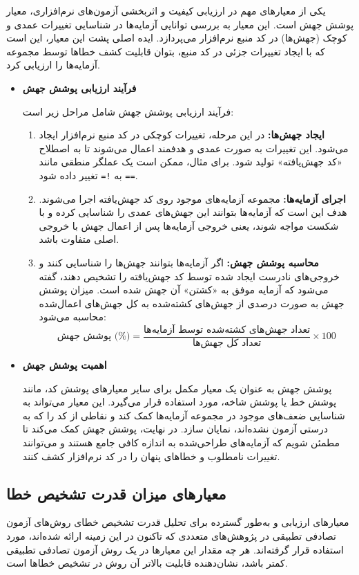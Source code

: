یکی از معیارهای مهم در ارزیابی کیفیت و اثربخشی آزمون‌های نرم‌افزاری، معیار پوشش جهش است. این معیار به بررسی توانایی آزمایه‌ها در شناسایی تغییرات عمدی و کوچک (جهش‌ها) در کد منبع نرم‌افزار می‌پردازد. ایده اصلی پشت این معیار، این است که با ایجاد تغییرات جزئی در کد منبع، بتوان قابلیت کشف خطاها توسط مجموعه آزمایه‌ها را ارزیابی کرد.

\begin{itemize}
	\item \textbf{فرآیند ارزیابی پوشش جهش}

فرآیند ارزیابی پوشش جهش شامل مراحل زیر است:

\begin{enumerate}
	\item \textbf{ایجاد جهش‌ها:} در این مرحله، تغییرات کوچکی در کد منبع نرم‌افزار ایجاد می‌شود. این تغییرات به صورت عمدی و هدفمند اعمال می‌شوند تا به اصطلاح «کد جهش‌یافته» تولید شود. برای مثال، ممکن است یک عملگر منطقی مانند \texttt{==} به \texttt{!=} تغییر داده شود.
	\item \textbf{اجرای آزمایه‌ها:} مجموعه آزمایه‌های موجود روی کد جهش‌یافته اجرا می‌شوند. هدف این است که آزمایه‌ها بتوانند این جهش‌های عمدی را شناسایی کرده و با شکست مواجه شوند، یعنی خروجی آزمایه‌ها پس از اعمال جهش با خروجی اصلی متفاوت باشد.
	\item \textbf{محاسبه پوشش جهش:} اگر آزمایه‌ها بتوانند جهش‌ها را شناسایی کنند و خروجی‌های نادرست ایجاد شده توسط کد جهش‌یافته را تشخیص دهند، گفته می‌شود که آزمایه موفق به «کشتن» آن جهش شده است. میزان پوشش جهش به صورت درصدی از جهش‌های کشته‌شده به کل جهش‌های اعمال‌شده محاسبه می‌شود:
	\[
	\text{پوشش جهش (\%)} = \frac{\text{تعداد جهش‌های کشته‌شده توسط آزمایه‌ها}}{\text{تعداد کل جهش‌ها}} \times 100
	\]
\end{enumerate}

	\item \textbf{اهمیت پوشش جهش}

پوشش جهش به عنوان یک معیار مکمل برای سایر معیارهای پوشش کد، مانند پوشش خط یا پوشش شاخه، مورد استفاده قرار می‌گیرد. این معیار می‌تواند به شناسایی ضعف‌های موجود در مجموعه آزمایه‌ها کمک کند و نقاطی از کد را که به درستی آزمون نشده‌اند، نمایان سازد. در نهایت، پوشش جهش کمک می‌کند تا مطمئن شویم که آزمایه‌های طراحی‌شده به اندازه کافی جامع هستند و می‌توانند تغییرات نامطلوب و خطاهای پنهان را در کد نرم‌افزار کشف کنند.

\end{itemize}

\subsection{معیارهای میزان قدرت تشخیص خطا}
معیارهای ارزیابی  و  به‌طور گسترده برای تحلیل قدرت تشخیص خطای روش‌های آزمون تصادفی تطبیقی در پژوهش‌های متعددی که تاکنون در این زمینه ارائه شده‌اند، مورد استفاده قرار گرفته‌اند. هر چه مقدار این معیارها در یک روش آزمون تصادفی تطبیقی کمتر باشد، نشان‌دهنده قابلیت بالاتر آن روش در تشخیص خطاها است.

